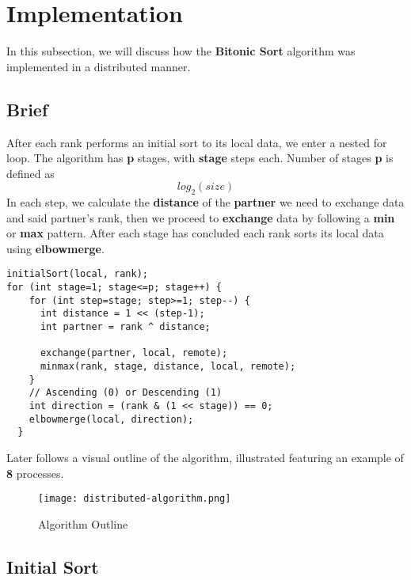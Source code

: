 \documentclass[12pt]{report}
\begin{document}
\section{Implementation}

In this subsection, we will discuss how the \textbf{Bitonic Sort} algorithm was implemented in a distributed manner. 

\subsection{Brief}

After each rank performs an initial sort to its local data, we enter a nested for loop. The algorithm has \textbf{p} stages, with \textbf{stage} steps each. Number of stages \textbf{p} is defined as 
$$
log_2(size)
$$
In each step, we calculate the \textbf{distance} of the \textbf{partner} we need to exchange data and said partner's rank, then we proceed to \textbf{exchange} data by following a \textbf{min} or \textbf{max} pattern. After each stage has concluded each rank sorts its local data using \textbf{elbowmerge}.

\begin{lstlisting}[style=cstyle]
initialSort(local, rank); 
for (int stage=1; stage<=p; stage++) {
    for (int step=stage; step>=1; step--) {
      int distance = 1 << (step-1);
      int partner = rank ^ distance;

      exchange(partner, local, remote);
      minmax(rank, stage, distance, local, remote);
    }
    // Ascending (0) or Descending (1)
    int direction = (rank & (1 << stage)) == 0;     
    elbowmerge(local, direction);
  }
\end{lstlisting}

Later follows a visual outline of the algorithm, illustrated featuring an example of \textbf{8} processes.

\begin{figure}
    \centering
    \texttt{[image: distributed-algorithm.png]}
    \caption{Algorithm Outline}
    \label{fig:enter-label}
\end{figure}

\subsection{Initial Sort}
\end{document}
